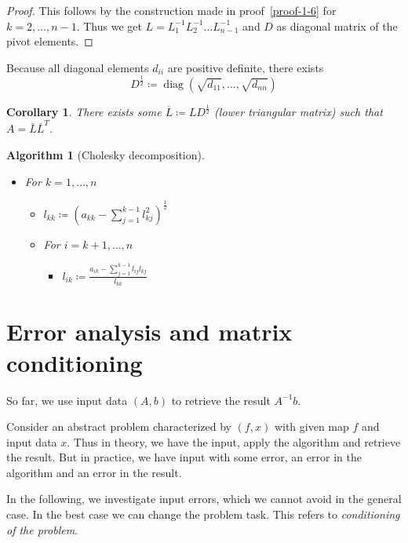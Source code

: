 \documentclass[a4paper]{article}
\newcounter{lecref}[section]
\numberwithin{lecref}{section}
\theoremstyle{break}
\newtheorem{algorithm}{Algorithm}
\newtheorem{corollary}[lecref]{Corollary}
\DeclareMathOperator{\diag}{diag}
\begin{document}
\begin{proof}
  This follows by the construction made in proof~\ref{proof-1-6} for $k=2,\dots,n-1$.
  Thus we get $L = L_1^{-1} L_2^{-1} \dots L_{n-1}^{-1}$ and $D$ as diagonal matrix of the pivot elements.
\end{proof}

Because all diagonal elements $d_{ii}$ are positive definite, there exists
\[ D^{\frac12} \coloneqq \diag\left(\sqrt{d_{11}}, \dots, \sqrt{d_{nn}}\right) \]

\begin{corollary}
  \label{corollary-1-8}
  There exists some $\overline{L} \coloneqq LD^{\frac12}$ (lower triangular matrix) such that $A = \overline{L} \overline{L}^T$.
\end{corollary}

\begin{algorithm}[Cholesky decomposition]\hfill{}
  \begin{itemize}
    \item For $k = 1, \dots, n$
      \begin{itemize}
        \item $l_{kk} \coloneqq (a_{kk} - \sum_{j=1}^{k-1} l_{kj}^2)^{\frac12}$
        \item For $i = k+1, \dots, n$
          \begin{itemize}
            \item $l_{ik} \coloneqq \frac{a_{ik} - \sum_{j=1}^{k-1} l_{ij} l_{kj}}{l_{kk}}$
          \end{itemize}
      \end{itemize}
  \end{itemize}
\end{algorithm}

\section{Error analysis and matrix conditioning}

So far, we use input data $(A, b)$ to retrieve the result $A^{-1} b$.

Consider an abstract problem characterized by $(f, x)$ with given map $f$ and input data $x$.
Thus in theory, we have the input, apply the algorithm and retrieve the result.
But in practice, we have input with some error, an error in the algorithm and an error in the result.

In the following, we investigate input errors, which we cannot avoid in the general case.
In the best case we can change the problem task. This refers to \emph{conditioning of the problem}.
\end{document}

